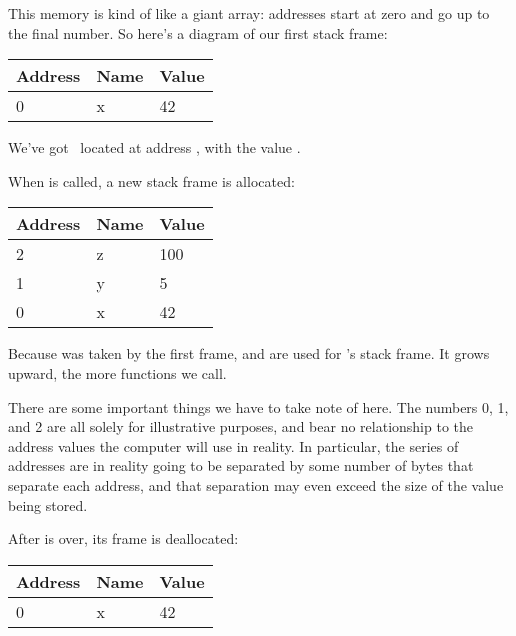 \blank

This memory is kind of like a giant array: addresses start at zero and go up to the final number. So here's a diagram of our first 
stack frame:

\begin{table}[H]
  \begin{tabular}{|l|l|l|}
    \hline
    \textbf{Address} & \textbf{Name} & \textbf{Value} \\
    \hline
    0 & x & 42 \\
    \hline
  \end{tabular}
\end{table}

We've got \x\ located at address , with the value .

When  is called, a new stack frame is allocated:

\begin{table}[H]
  \begin{tabular}{|l|l|l|}
    \hline
    \textbf{Address} & \textbf{Name} & \textbf{Value} \\
    \hline
    2 & z & 100 \\
    \hline
    1 & y & 5 \\
    \hline
    0 & x & 42 \\
    \hline
  \end{tabular}
\end{table}

Because  was taken by the first frame,  and  are used for 's stack frame. It grows upward, the more 
functions we call.

\blank

There are some important things we have to take note of here. The numbers 0, 1, and 2 are all solely for illustrative purposes, and 
bear no relationship to the address values the computer will use in reality. In particular, the series of addresses are in reality 
going to be separated by some number of bytes that separate each address, and that separation may even exceed the size of the value 
being stored.

\blank

After  is over, its frame is deallocated:

\begin{table}[H]
  \begin{tabular}{|l|l|l|}
    \hline
    \textbf{Address} & \textbf{Name} & \textbf{Value} \\
    \hline
    0 & x & 42 \\
    \hline
  \end{tabular}
\end{table}

